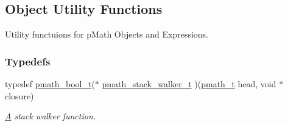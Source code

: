 \hypertarget{group__helpers}{
\subsection{Object Utility Functions}
\label{group__helpers}
}
Utility functuions for pMath Objects and Expressions.  


\subsubsection*{Typedefs}
\begin{CompactItemize}
\item 
typedef \hyperlink{group__general__types_gc92090cb0b56345d6c379ed2341d4ef4}{pmath\_\-bool\_\-t}($\ast$ \hyperlink{group__helpers_g11afc6451921f3169224096723483c64}{pmath\_\-stack\_\-walker\_\-t} )(\hyperlink{classpmath__t}{pmath\_\-t} head, void $\ast$closure)
\begin{CompactList}\small\item\em \hyperlink{class_a}{A} stack walker function. \item\end{CompactList}\end{CompactItemize}
